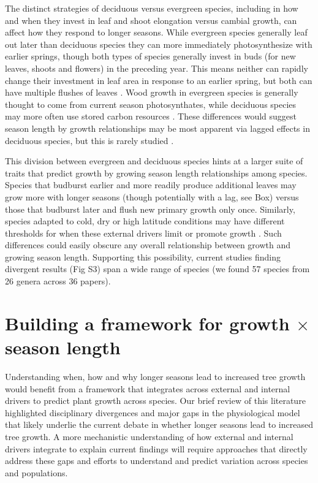 \documentclass[11pt]{article}
\begin{document}
The distinct strategies of deciduous versus evergreen species, including in how and when they invest in leaf and shoot elongation versus cambial growth, can affect how they respond to longer seasons. While evergreen species generally leaf out later than deciduous species they can more immediately photosynthesize with earlier springs, though both types of species generally invest in buds (for new leaves, shoots and flowers) in the preceding year. This means neither can rapidly change their investment in leaf area in response to an earlier spring, but both can have multiple flushes of leaves \citep{day2011regulation,soolanayakanahally2013timing}. Wood growth in evergreen species is generally thought to come from current season photosynthates, while deciduous species may more often use stored carbon resources \citep{gordon1968seasonal,monson2018finding}. These differences would suggest season length by growth relationships
may be most apparent via lagged effects in deciduous species, but this is rarely studied  \citep[and not clearly supported to date, see][]{coulthard2020limits,klesse2023legacy}. 

This division between evergreen and deciduous species hints at a larger suite of traits that predict growth by growing season length relationships among species. Species that budburst earlier and more readily produce additional leaves \citep[e.g. leaf flushes after budset, and other characteristics more common to `indeterminate' species,][]{kikuzawa1982leaf,Lechowicz:1984cr} may grow more with longer seasons (though potentially with a lag, see Box) versus those that budburst later and flush new primary growth only once. Similarly, species adapted to cold, dry or high latitude conditions may have different thresholds for when these external drivers limit or promote growth \citep[e.g. some \emph{Populus} and \emph{Quercus} species,][and see Fig.3]{soolanayakanahally2013timing,mckown2016impacts,delpierre2017tree,de2022temperature}. Such differences could easily obscure any overall relationship between growth and growing season length. Supporting this possibility, current studies finding divergent results (Fig S3) span a wide range of species (we found  57 species from 26 genera across 36 papers). 

\section*{Building a framework for growth $\times$ season length} %

Understanding when, how and why longer seasons lead to increased tree growth would benefit from a framework that integrates across external and internal drivers to predict plant growth across species. Our brief review of this literature highlighted disciplinary divergences and major gaps in the physiological model \citep[see Box, and ][]{korner2015paradigm,rossi2008critical,rademacher2022insights} that likely underlie the current debate in whether longer seasons lead to increased tree growth. A more mechanistic understanding of how external and internal drivers integrate to explain current findings will require approaches that directly address these gaps and efforts to understand and predict variation across species and populations. 
\end{document}
